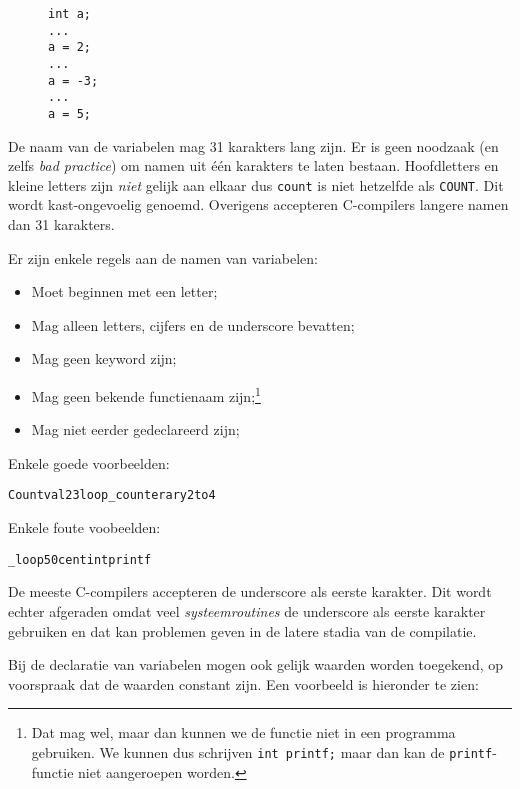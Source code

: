 \begin{figure}[!ht]
\begin{lstlisting}[caption=Meerdere toekenningen aan een variabele.]
int a;
...
a = 2;
...
a = -3;
...
a = 5;
\end{lstlisting}
\end{figure}

De naam van de variabelen mag 31 karakters lang zijn. Er is geen noodzaak (en zelfs \textsl{bad practice}) om namen uit één karakters te laten bestaan. Hoofdletters en kleine letters zijn \textsl{niet} gelijk aan elkaar dus \texttt{count} is niet hetzelfde als \texttt{COUNT}. Dit wordt kast-ongevoelig genoemd. Overigens accepteren C-compilers langere namen dan 31 karakters.

Er zijn enkele regels aan de namen van variabelen:

\begin{itemize}
\item Moet beginnen met een letter;
\item Mag alleen letters, cijfers en de underscore bevatten;
\item Mag geen keyword zijn;
\item Mag geen bekende functienaam zijn;\footnote{Dat mag wel, maar dan kunnen we de functie niet in een programma gebruiken. We kunnen dus schrijven \texttt{int printf;} maar dan kan de \texttt{printf}-functie niet aangeroepen worden.}
\item Mag niet eerder gedeclareerd zijn;
\end{itemize}

Enkele goede voorbeelden:

\hspace*{1em}\texttt{Count}\quad\texttt{val23}\quad\texttt{loop\_counter}\quad\texttt{ary2to4}

Enkele foute voobeelden:

\hspace*{1em}\texttt{\_loop}\quad\texttt{50cent}\quad\texttt{int}\quad\texttt{printf}

De meeste C-compilers accepteren de underscore als eerste karakter. Dit wordt echter afgeraden omdat veel \textsl{systeemroutines} de underscore als eerste karakter gebruiken en dat kan problemen geven in de latere stadia van de compilatie.

Bij de declaratie van variabelen mogen ook gelijk waarden worden toegekend, op voorspraak dat de waarden constant zijn. Een voorbeeld is hieronder te zien:

